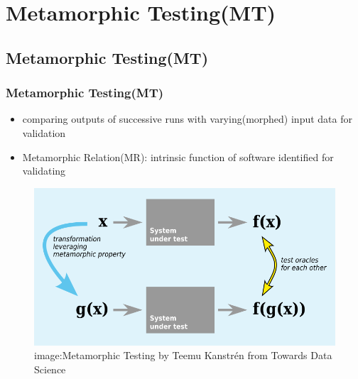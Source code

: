 
\section{Metamorphic Testing(MT)}
\subsection{Metamorphic Testing(MT)}


\begin{frame}[fragile]
	\frametitle{Metamorphic Testing(MT)}
	\begin{itemize}
		\item comparing outputs of successive runs with varying(morphed) input data for validation
		\item Metamorphic Relation(MR): intrinsic function of software identified for validating
	\end{itemize}	

			\begin{figure}
				 \includegraphics[scale = 0.30]{images/Metamorphic_Testing_image}
				\linebreak
			 	\tiny{image:Metamorphic Testing by Teemu Kanstrén from Towards Data Science}
			\end{figure}
		
	
\end{frame}


